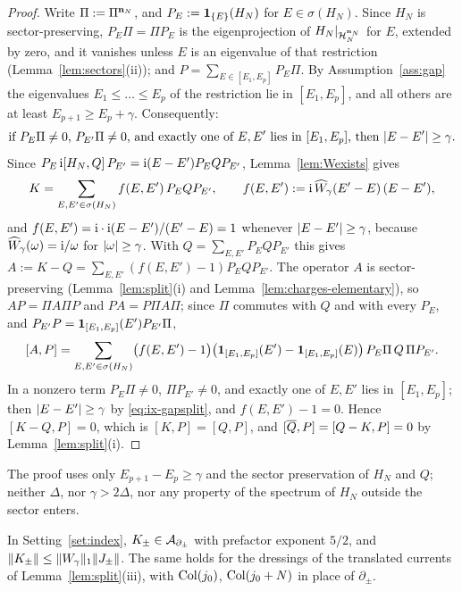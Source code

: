 \begin{proof}
Write $\Pi:=\Pi^{\mathbf{n}_N}$, and $P_E:=\mathbf{1}_{\{E\}}(H_N)$ for $E\in\sigma(H_N)$. Since $H_N$ is sector-preserving,
$P_E\Pi=\Pi P_E$ is the eigenprojection of $H_N|_{\mathcal{H}_N^{\mathbf{n}_N}}$ for $E$, extended by zero, and it vanishes unless $E$
is an eigenvalue of that restriction (Lemma~\ref{lem:sectors}(ii)); and $P=\sum_{E\in[E_1,E_p]}P_E\Pi$. By
Assumption~\ref{ass:gap} the eigenvalues $E_1\le\dots\le E_p$ of the restriction lie in $[E_1,E_p]$, and all others are
at least $E_{p+1}\ge E_p+\gamma$. Consequently:
\begin{equation}\label{eq:ix-gapsplit}
\text{if $P_E\Pi\ne0$, $P_{E'}\Pi\ne0$, and exactly one of $E,E'$ lies in $[E_1,E_p]$, then $\lvert E-E'\rvert\ge\gamma$.}
\end{equation}
Since $P_E\,\mathrm{i}[H_N,Q]\,P_{E'}=\mathrm{i}(E-E')P_EQP_{E'}$, Lemma~\ref{lem:Wexists} gives
\[
K=\sum_{E,E'\in\sigma(H_N)}f(E,E')\,P_EQP_{E'},\qquad f(E,E'):=\mathrm{i}\,\widehat W_\gamma(E'-E)\,(E-E'),
\]
and $f(E,E')=\mathrm{i}\cdot\mathrm{i}(E-E')/(E'-E)=1$ whenever $\lvert E-E'\rvert\ge\gamma$, because $\widehat W_\gamma(\omega)=\mathrm{i}/\omega$ for
$\lvert\omega\rvert\ge\gamma$. With $Q=\sum_{E,E'}P_EQP_{E'}$ this gives $A:=K-Q=\sum_{E,E'}(f(E,E')-1)P_EQP_{E'}$. The operator $A$
is sector-preserving (Lemma~\ref{lem:split}(i) and Lemma~\ref{lem:charges-elementary}), so $AP=\Pi A\Pi P$ and
$PA=P\Pi A\Pi$; since $\Pi$ commutes with $Q$ and with every $P_E$, and $P_{E'}P=\mathbf{1}_{[E_1,E_p]}(E')P_{E'}\Pi$,
\[
[A,P]=\sum_{E,E'\in\sigma(H_N)}\bigl(f(E,E')-1\bigr)\bigl(\mathbf{1}_{[E_1,E_p]}(E')-\mathbf{1}_{[E_1,E_p]}(E)\bigr)\,P_E\Pi\,Q\,\Pi P_{E'} .
\]
In a nonzero term $P_E\Pi\ne0$, $\Pi P_{E'}\ne0$, and exactly one of $E,E'$ lies in $[E_1,E_p]$; then
$\lvert E-E'\rvert\ge\gamma$ by \eqref{eq:ix-gapsplit}, and $f(E,E')-1=0$. Hence $[K-Q,P]=0$, which is $[K,P]=[Q,P]$, and
$[\overline{Q},P]=[Q-K,P]=0$ by Lemma~\ref{lem:split}(i).
\end{proof}

The proof uses only $E_{p+1}-E_p\ge\gamma$ and the sector preservation of $H_N$ and $Q$; neither $\Delta$, nor
$\gamma>2\Delta$, nor any property of the spectrum of $H_N$ outside the sector enters.

\begin{lemma}\label{lem:Klocal}
In Setting~\ref{set:index}, $K_\pm\in\mathcal{A}_{\partial_\pm}$ with prefactor exponent $5/2$, and
$\lVert K_\pm\rVert\le\lVert W_{\gamma}\rVert_1\lVert J_\pm\rVert$. The same holds for the dressings of the translated currents of
Lemma~\ref{lem:split}(iii), with $\mathrm{Col}(j_0)$, $\mathrm{Col}(j_0+N)$ in place of $\partial_\pm$.
\end{lemma}

